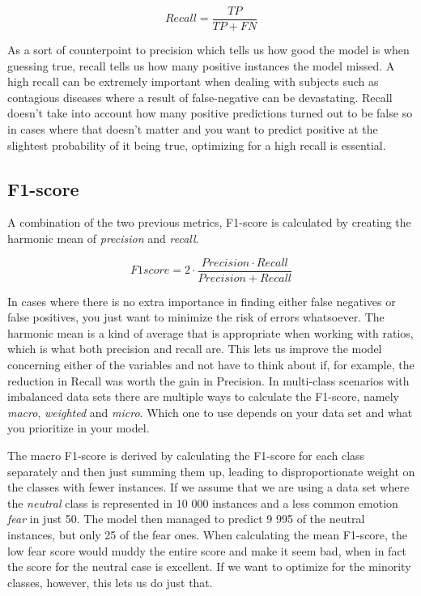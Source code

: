 \documentclass[nofilelist]{cslthse-msc}
\begin{document}
$$ Recall =\frac{TP}{TP + FN}$$

As a sort of counterpoint to precision which tells us how good the model is when guessing true, recall tells us how many positive instances the model missed. A high recall can be extremely important when dealing with subjects such as contagious diseases where a result of false-negative can be devastating. Recall doesn't take into account how many positive predictions turned out to be false so in cases where that doesn't matter and you want to predict positive at the slightest probability of it being true, optimizing for a high recall is essential.


\subsection{F1-score}
A combination of the two previous metrics, F1-score is calculated by creating the harmonic mean of \textit{precision} and \textit{recall}.

$$ F1score = 2 \cdot \frac{Precision \cdot Recall}{Precision + Recall} $$

In cases where there is no extra importance in finding either false negatives or false positives, you just want to minimize the risk of errors whatsoever. The harmonic mean is a kind of average that is appropriate when working with ratios, which is what both precision and recall are. This lets us improve the model concerning either of the variables and not have to think about if, for example, the reduction in Recall was worth the gain in Precision. In multi-class scenarios with imbalanced data sets there are multiple ways to calculate the F1-score, namely \textit{macro}, \textit{weighted} and \textit{micro}. Which one to use depends on your data set and what you prioritize in your model. 

The macro F1-score is derived by calculating the F1-score for each class separately and then just summing them up, leading to disproportionate weight on the classes with fewer instances. If we assume that we are using a data set where the \textit{neutral} class is represented in 10 000 instances and a less common emotion \textit{fear} in just 50. The model then managed to predict 9 995 of the neutral instances, but only 25 of the fear ones. When calculating the mean F1-score, the low fear score would muddy the entire score and make it seem bad, when in fact the score for the neutral case is excellent. If we want to optimize for the minority classes, however, this lets us do just that. 
\end{document}
